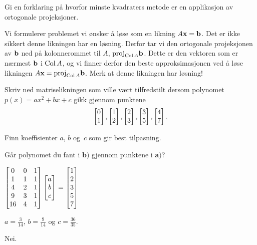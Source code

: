 \begin{losning}
\end{losning}

\begin{oppgave}
Gi en forklaring på hvorfor minste kvadraters metode er en applikasjon av ortogonale projeksjoner.
\end{oppgave}

\begin{losning}
Vi formulerer problemet vi ønsker å løse som en likning $A\mathbf{x}=\mathbf{b}$. Det er ikke sikkert denne likningen har en løsning. Derfor tar vi den ortogonale projeksjonen av $\mathbf{b}$ ned på kolonnerommet til $A$, $\text{proj}_{\operatorname{Col} A}\mathbf{b}$. Dette er den vektoren som er nærmest $\mathbf{b}$ i $\operatorname{Col} A$, og vi finner derfor den beste approksimasjonen ved å løse likningen $A\mathbf{x}=\text{proj}_{\operatorname{Col} A}\mathbf{b}$. Merk at denne likningen har løsning!
\end{losning}

\begin{oppgave}
\begin{punkt}
Skriv ned matriselikningen som ville vært tilfredstilt dersom polynomet $p(x)=ax^2+bx+c$ gikk gjennom punktene
$$\begin{bmatrix} 0 \\ 1 \end{bmatrix}, \begin{bmatrix} 1 \\ 2 \end{bmatrix}, \begin{bmatrix} 2 \\ 3 \end{bmatrix},\begin{bmatrix} 3 \\ 5 \end{bmatrix},\begin{bmatrix} 4 \\ 7 \end{bmatrix}.$$
\end{punkt}
\begin{punkt}
Finn koeffisienter $a$, $b$ og~$c$ som gir best tilpasning.
\end{punkt}

\begin{punkt}
Går polynomet du fant i $\textbf{b)}$ gjennom punktene i $\textbf{a)}$?
\end{punkt}

\end{oppgave}

\begin{losning}
\begin{punkt}
$
\begin{bmatrix}
0 & 0 & 1\\
1 & 1 & 1\\
4 & 2 & 1\\
9 & 3 & 1\\
16 & 4 & 1
\end{bmatrix}\begin{bmatrix} a \\ b \\ c \end{bmatrix}=\begin{bmatrix}
1\\
2\\
3\\
5\\
7
\end{bmatrix}$
\end{punkt}

\begin{punkt}
$a=\frac{3}{14}$, $b=\frac{9}{14}$ og $c=\frac{36}{35}$.
\end{punkt}

\begin{punkt}
Nei.
\end{punkt}

\end{losning}


